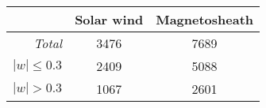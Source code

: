 \begin{tabular}{rcc}
    \hline
                  & Solar wind & Magnetosheath \\
    \hline
    \textit{Total}& 3476 & 7689 \\
    $|w|\leq 0.3$ & 2409 & 5088 \\
    $|w|> 0.3$    & 1067 & 2601 \\
    \hline
\end{tabular}